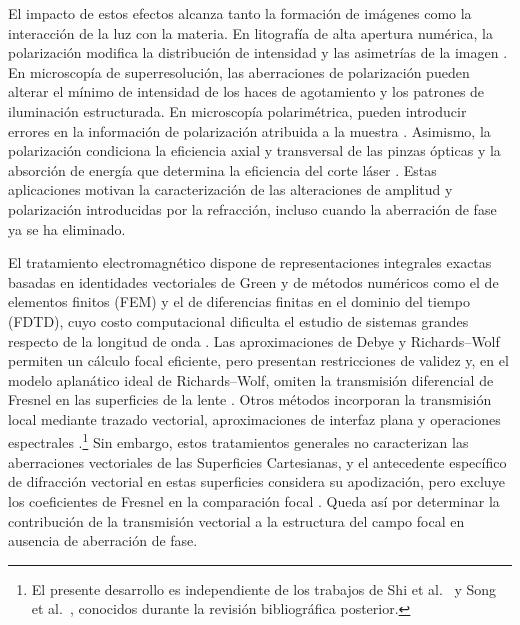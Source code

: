 El impacto de estos efectos alcanza tanto la formación de imágenes como la
interacción de la luz con la materia. En litografía de alta apertura
numérica, la polarización modifica la distribución de intensidad y las
asimetrías de la imagen \cite{flagello1996}. En microscopía de
superresolución, las aberraciones de polarización pueden alterar el mínimo
de intensidad de los haces de agotamiento y los patrones de iluminación
estructurada. En microscopía polarimétrica, pueden introducir errores en
la información de polarización atribuida a la muestra \cite{Shen2022}.
Asimismo, la
polarización condiciona la eficiencia axial y transversal de las pinzas
ópticas \cite{Kozawa2010Trapping} y la absorción de energía que determina la
eficiencia del corte láser \cite{Niziev1999Cutting}. Estas aplicaciones
motivan la caracterización de las alteraciones de amplitud y polarización
introducidas por la refracción, incluso cuando la aberración de fase ya se
ha eliminado.

El tratamiento electromagnético dispone de representaciones integrales
exactas basadas en identidades vectoriales de Green \cite{StrattonChu1939}
y de métodos numéricos como el de elementos finitos (FEM) y el de diferencias
finitas en el dominio del tiempo (FDTD), cuyo costo computacional dificulta
el estudio de sistemas grandes respecto de la longitud de onda
\cite{Shi2019Curved,Wende2022,Song2025}. Las aproximaciones de Debye y
Richards--Wolf permiten un cálculo focal eficiente, pero presentan
restricciones de validez y, en el modelo aplanático ideal de
Richards--Wolf, omiten la transmisión diferencial de Fresnel en las
superficies de la lente
\cite{RichardsWolf1959,Sheppard2013Debye,Shi2019RealLenses,Wang2020Debye}.
Otros métodos incorporan la transmisión local mediante trazado vectorial,
aproximaciones de interfaz plana y operaciones espectrales
\cite{Kim18,Shi2019Curved,Wende2022,Song2025}.\footnote{El presente
desarrollo es independiente de los trabajos de Shi et
al.~\cite{Shi2019Curved} y Song et al.~\cite{Song2025}, conocidos durante
la revisión bibliográfica posterior.} Sin embargo, estos tratamientos
generales no caracterizan las aberraciones vectoriales de las Superficies
Cartesianas, y el antecedente específico de difracción vectorial en estas
superficies considera su apodización, pero excluye los coeficientes de
Fresnel en la comparación focal \cite{GonzalezAcuna2022Oval}. Queda así por
determinar la contribución de la transmisión vectorial a la estructura del
campo focal en ausencia de aberración de fase.


